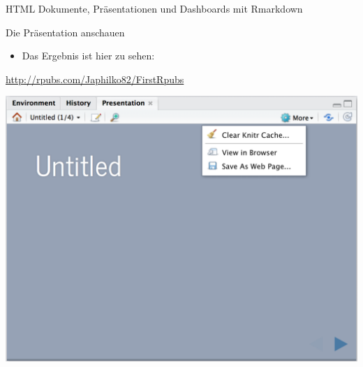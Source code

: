 \documentclass[ignorenonframetext,]{beamer}
\providecommand{\tightlist}{%
\setlength{\itemsep}{0pt}\setlength{\parskip}{0pt}}
\begin{document}
\begin{frame}[fragile]{HTML Dokumente, Präsentationen und Dashboards mit
Rmarkdown}
\begin{block}{Die Präsentation anschauen}
\begin{itemize}
\tightlist
\item
  Das Ergebnis ist hier zu sehen:
\end{itemize}

\url{http://rpubs.com/Japhilko82/FirstRpubs}

\includegraphics{./tex2pdf.9796/939ee613f01c6e79e04ac4b99515154375f2cfb6.png}

\end{block}

\end{frame}
\end{document}
